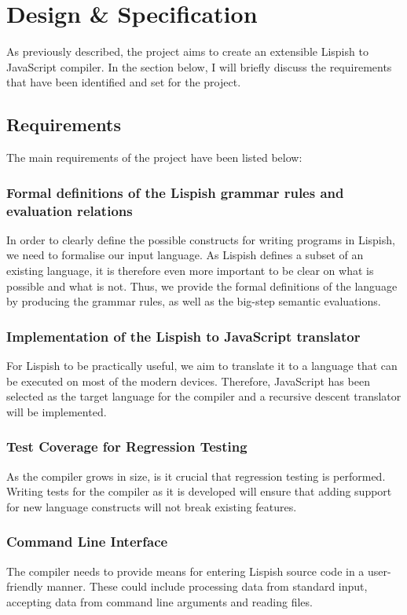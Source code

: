 \chapter{Design \& Specification}

As previously described, the project aims to create an extensible Lispish to JavaScript compiler. 
In the section below, I will briefly discuss the requirements that have been identified and set for the project. 


\section{Requirements}\label{requirements}
The main requirements of the project have been listed below: 

\subsection{Formal definitions of the Lispish grammar rules and evaluation relations}
In order to clearly define the possible constructs for writing programs in Lispish, we need to formalise our input language. 
As Lispish defines a subset of an existing language, it is therefore even more important to be clear on what is possible and what is not. 
Thus, we provide the formal definitions of the language by producing the grammar rules, as well as the big-step semantic evaluations. 

\subsection{Implementation of the Lispish to JavaScript translator}
For Lispish to be practically useful, we aim to translate it to a language that can be executed on most of the modern devices. Therefore, JavaScript has been selected as the target language for the compiler and a recursive descent translator will be implemented. 

\subsection{Test Coverage for Regression Testing}
As the compiler grows in size, is it crucial that regression testing is performed. Writing tests for the compiler as it is developed will ensure that adding support for new language constructs will not break existing features.

\subsection{Command Line Interface}
The compiler needs to provide means for entering Lispish source code in a user-friendly manner. These could include processing data from standard input, accepting data from command line arguments and reading files.

